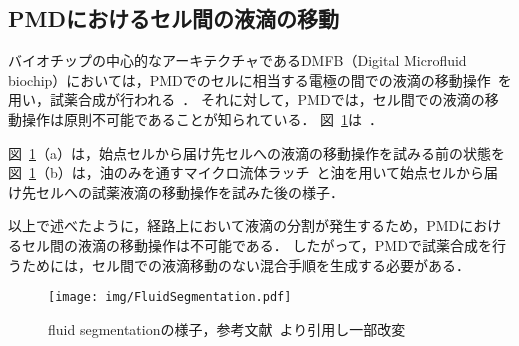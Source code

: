 \subsection{PMDにおけるセル間の液滴の移動}
バイオチップの中心的なアーキテクチャであるDMFB（Digital Microfluid biochip）においては，PMDでのセルに相当する電極の間での液滴の移動操作~\cite{B110474H}を用い，試薬合成が行われる~\cite{5605330}\cite{10.1007/s11047-006-9032-6}\cite{10.1145/2429384.2429464}．
それに対して，PMDでは，セル間での液滴の移動操作は原則不可能であることが知られている．
図~\ref{fig:fluidseg}は~\cite{4}． 

図~\ref{fig:fluidseg}（a）は，始点セルから届け先セルへの液滴の移動操作を試みる前の状態を
図~\ref{fig:fluidseg}（b）は，油のみを通すマイクロ流体ラッチ~\cite{urbanski2006digital}と油を用いて始点セルから届け先セルへの試薬液滴の移動操作を試みた後の様子．

以上で述べたように，経路上において液滴の分割が発生するため，PMDにおけるセル間の液滴の移動操作は不可能である．
したがって，PMDで試薬合成を行うためには，セル間での液滴移動のない混合手順を生成する必要がある．
\begin{figure}[tbp]
    \centering\texttt{[image: img/FluidSegmentation.pdf]}
 \caption{fluid segmentationの様子，参考文献~\cite{4}より引用し一部改変}\label{fig:fluidseg}
\end{figure}
\newpage
